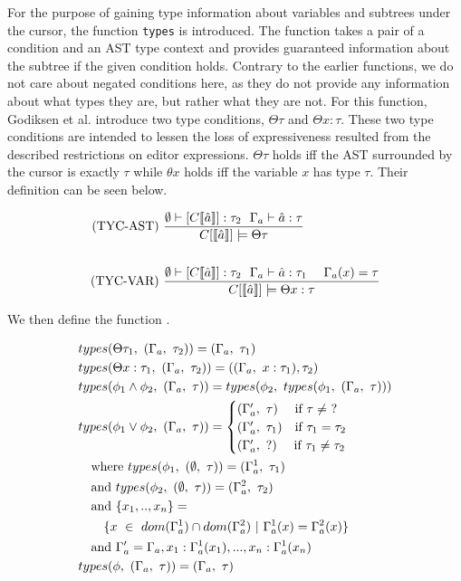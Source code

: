 For the purpose of gaining type information about variables and subtrees under
the cursor, the function \texttt{types} is introduced. The function takes a pair
of a condition and an AST type context and provides guaranteed information about
the subtree if the given condition holds. Contrary to the earlier functions, we
do not care about negated conditions here, as they do not provide any
information about what types they are, but rather what they are not. For this
function, Godiksen et al. introduce two type conditions, $\Theta \tau$ and
$\Theta x : \tau$. These two type conditions are intended to lessen the loss of
expressiveness resulted from the described restrictions on editor expressions.
$\Theta \tau$ holds iff the AST surrounded by the cursor is exactly $\tau$ while
$\theta x$ holds iff the variable $x$ has type $\tau$. Their definition can be
seen below.

\begin{align*}
    \text{(TYC-AST) } &\frac{\emptyset \vdash [C\llbracket \hat{a} \rrbracket] : \tau_2~~\Gamma_{a}\vdash \hat{a} : \tau }{C[\llbracket \hat{a} \rrbracket] \models \Theta \tau}\\\\
    \text{(TYC-VAR) } &\frac{\emptyset \vdash [C\llbracket \hat{a} \rrbracket] : \tau_2~~\Gamma_{a}\vdash \hat{a} : \tau_1 ~~~~ \Gamma_{a}(x) = \tau }{C[\llbracket \hat{a} \rrbracket] \models \Theta x : \tau}
\end{align*}

We then define the function .

\begin{align*}
    &types( \Theta \tau_1,~(\Gamma_{a},~\tau_2)) = (\Gamma_{a},~\tau_1)\\
    &types( \Theta x : \tau_1,~(\Gamma_{a},~\tau_2)) = ((\Gamma_{a},~x : \tau_1), \tau_2)\\
    &types( \phi_1 \land \phi_2,~(\Gamma_{a},~\tau)) = types(\phi_2,~types(\phi_1,~(\Gamma_{a},~\tau)))\\
    &types( \phi_1 \lor \phi_2,~(\Gamma_{a},~\tau)) =
    \begin{cases}
        (\Gamma_a^\prime,~\tau) ~~~~\text{if}~\tau \neq ~? \\
        (\Gamma_a^\prime,~\tau_1) ~~~\text{if}~\tau_1 = \tau_2 \\
        (\Gamma_a^\prime,~?) ~~~~\text{if}~\tau_1 \neq \tau_2
    \end{cases}\\
    &~~~\text{where } types(\phi_1,~(\emptyset,~\tau)) = (\Gamma_a^1,~\tau_1)\\
    &~~~\text{and } types(\phi_2,~(\emptyset,~\tau)) = (\Gamma_a^2,~\tau_2)\\
    &~~~\text{and } \{x_1,..,x_n\}  = \\
    &~~~~~~\{x~\in~dom(\Gamma_a^1)\cap dom(\Gamma_a^2) ~|~ \Gamma_a^1(x)=\Gamma_a^2(x)\}\\
    &~~~\text{and } \Gamma_a^\prime = \Gamma_a, x_1 : \Gamma_a^1(x_1),...,x_n : \Gamma_a^1(x_n)\\
    &types(\phi,~(\Gamma_a,~\tau)) = (\Gamma_a,~\tau)
\end{align*}

